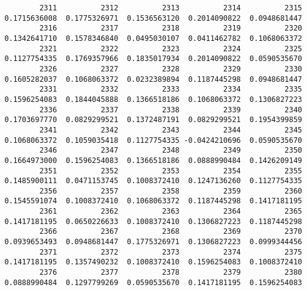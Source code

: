 \documentclass[
  letterpaper,
  DIV=11,
  numbers=noendperiod]{scrreprt}
\newenvironment{Shaded}{\begin{snugshade}}{\end{snugshade}}
\newcommand{\CommentTok}[1]{\textcolor[rgb]{0.37,0.37,0.37}{#1}}
\newcommand{\FunctionTok}[1]{\textcolor[rgb]{0.28,0.35,0.67}{#1}}
\newcommand{\NormalTok}[1]{\textcolor[rgb]{0.00,0.23,0.31}{#1}}
\newcommand{\OtherTok}[1]{\textcolor[rgb]{0.00,0.23,0.31}{#1}}
\newcommand{\SpecialCharTok}[1]{\textcolor[rgb]{0.37,0.37,0.37}{#1}}
\begin{document}
\begin{verbatim}
         2311          2312          2313          2314          2315 
 0.1715636008  0.1775326971  0.1536563120  0.2014090822  0.0948681447 
         2316          2317          2318          2319          2320 
 0.1342641710  0.1578346840  0.0495030107  0.0411462782  0.1068063372 
         2321          2322          2323          2324          2325 
 0.1127754335  0.1769357966  0.1835017934  0.2014090822  0.0590535670 
         2326          2327          2328          2329          2330 
 0.1605282037  0.1068063372  0.0232389894  0.1187445298  0.0948681447 
         2331          2332          2333          2334          2335 
 0.1596254083  0.1844045888  0.1366518186  0.1068063372  0.1306827223 
         2336          2337          2338          2339          2340 
 0.1703697770  0.0829299521  0.1372487191  0.0829299521  0.1954399859 
         2341          2342          2343          2344          2345 
 0.1068063372  0.1059035418  0.1127754335 -0.0424210696  0.0590535670 
         2346          2347          2348          2349          2350 
 0.1664973000  0.1596254083  0.1366518186  0.0888990484  0.1426209149 
         2351          2352          2353          2354          2355 
 0.1485900111  0.0471153745  0.1008372410  0.1247136260  0.1127754335 
         2356          2357          2358          2359          2360 
 0.1545591074  0.1008372410  0.1068063372  0.1187445298  0.1417181195 
         2361          2362          2363          2364          2365 
 0.1417181195  0.0650226633  0.1008372410  0.1306827223  0.1187445298 
         2366          2367          2368          2369          2370 
 0.0939653493  0.0948681447  0.1775326971  0.1306827223  0.0999344456 
         2371          2372          2373          2374          2375 
 0.1417181195  0.1357490232  0.1008372410  0.1596254083  0.1008372410 
         2376          2377          2378          2379          2380 
 0.0888990484  0.1297799269  0.0590535670  0.1417181195  0.1596254083 
\end{verbatim}

\begin{Shaded}
\end{Shaded}
\end{document}
